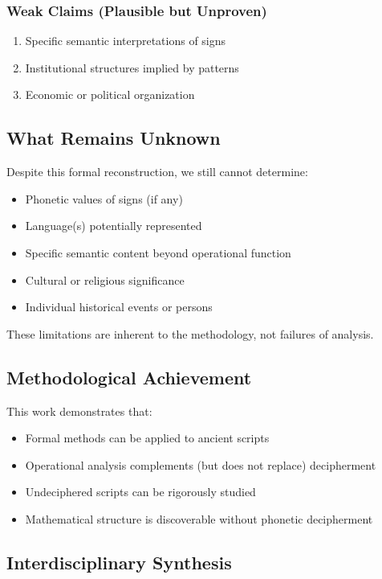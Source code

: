 \subsubsection{Weak Claims (Plausible but Unproven)}
\begin{enumerate}
    \item Specific semantic interpretations of signs
    \item Institutional structures implied by patterns
    \item Economic or political organization
\end{enumerate}

\subsection{What Remains Unknown}

Despite this formal reconstruction, we still cannot determine:
\begin{itemize}
    \item Phonetic values of signs (if any)
    \item Language(s) potentially represented
    \item Specific semantic content beyond operational function
    \item Cultural or religious significance
    \item Individual historical events or persons
\end{itemize}

These limitations are inherent to the methodology, not failures of analysis.

\subsection{Methodological Achievement}

This work demonstrates that:
\begin{itemize}
    \item Formal methods can be applied to ancient scripts
    \item Operational analysis complements (but does not replace) decipherment
    \item Undeciphered scripts can be rigorously studied
    \item Mathematical structure is discoverable without phonetic decipherment
\end{itemize}

\subsection{Interdisciplinary Synthesis}

